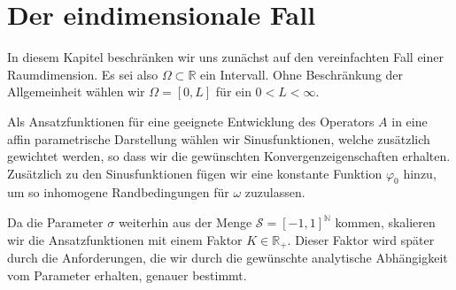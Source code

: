 
\chapter{Der eindimensionale Fall}
\label{sec:der_eindimensionale_fall}
\label{cha:der_eindimensionale_fall}


In diesem Kapitel beschränken wir uns zunächst auf den vereinfachten Fall einer Raumdimension.
Es sei also $\Omega \subset \mathbb{R}$ ein Intervall.
Ohne Beschränkung der Allgemeinheit wählen wir $\Omega = [0, L]$ für ein $0 < L < \infty$.



Als Ansatzfunktionen für eine geeignete Entwicklung des Operators $A$ in eine affin parametrische Darstellung wählen wir Sinusfunktionen, welche zusätzlich gewichtet werden, so dass wir die gewünschten Konvergenzeigenschaften erhalten.
Zusätzlich zu den Sinusfunktionen fügen wir eine konstante Funktion $\varphi_{0}$ hinzu, um so inhomogene Randbedingungen für $\omega$ zuzulassen.

Da die Parameter $\sigma$ weiterhin aus der Menge $\mathcal S = [-1, 1]^{\mathbb{N}}$ kommen, skalieren wir die Ansatzfunktionen mit einem Faktor $K \in \mathbb{R}_{+}$.
Dieser Faktor wird später durch die Anforderungen, die wir durch die gewünschte analytische Abhängigkeit vom Parameter erhalten, genauer bestimmt.

